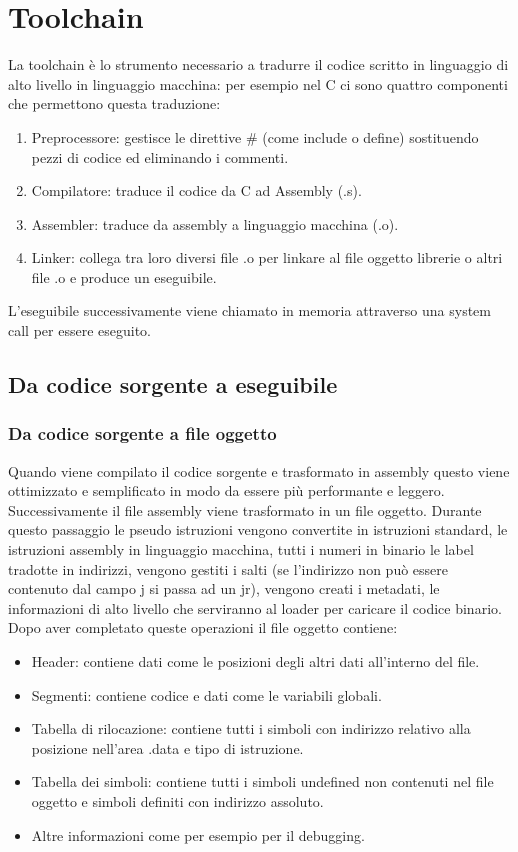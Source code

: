 \chapter{Toolchain}
La toolchain \`e lo strumento necessario a tradurre il codice scritto in linguaggio di alto livello in linguaggio macchina: per esempio nel C ci sono quattro componenti
che permettono questa traduzione:
\begin{enumerate}
\item Preprocessore: gestisce le direttive \# (come include o define) sostituendo pezzi di codice ed eliminando i commenti. 
\item Compilatore: traduce il codice da C ad Assembly (.s).
\item Assembler: traduce da assembly a linguaggio macchina (.o).
\item Linker: collega tra loro diversi file .o per linkare al file oggetto librerie o altri file .o e produce un eseguibile. 
\end{enumerate}
L'eseguibile successivamente viene chiamato in memoria attraverso una system call per essere eseguito. 
\section{Da codice sorgente a eseguibile}
\subsection{Da codice sorgente a file oggetto}
Quando viene compilato il codice sorgente e trasformato in assembly questo viene ottimizzato e semplificato in modo da essere pi\`u performante e leggero. 
Successivamente il file assembly viene trasformato in un file oggetto. Durante questo passaggio le pseudo istruzioni vengono convertite in istruzioni standard, le 
istruzioni assembly in linguaggio macchina, tutti i numeri in binario le label tradotte in indirizzi, vengono gestiti i salti (se l'indirizzo non pu\`o essere contenuto 
dal campo j si passa ad un jr), vengono creati i metadati, le informazioni di alto livello che serviranno al loader per caricare il codice binario. Dopo aver completato 
queste operazioni il file oggetto contiene:
\begin{itemize}
\item Header: contiene dati come le posizioni degli altri dati all'interno del file.
\item Segmenti: contiene codice e dati come le variabili globali.
\item Tabella di rilocazione: contiene tutti i simboli con indirizzo relativo alla posizione nell'area .data e tipo di istruzione.
\item Tabella dei simboli: contiene tutti i simboli undefined non contenuti nel file oggetto e simboli definiti con indirizzo assoluto.
\item Altre informazioni come per esempio per il debugging. 
\end{itemize}

